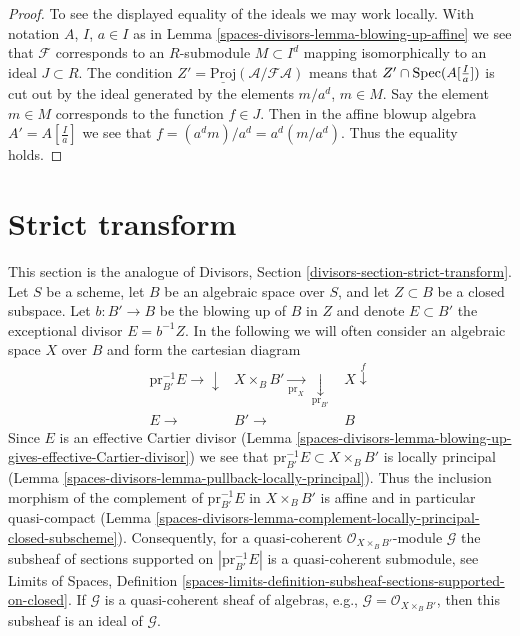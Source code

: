 \begin{proof}
\medskip\noindent
To see the displayed equality of the ideals we may work locally.
With notation $A$, $I$, $a \in I$ as in Lemma \ref{spaces-divisors-lemma-blowing-up-affine}
we see that $\mathcal{F}$ corresponds to an $R$-submodule $M \subset I^d$
mapping isomorphically to an ideal $J \subset R$. The condition
$Z' = \underline{\text{Proj}}(\mathcal{A}/\mathcal{F}\mathcal{A})$
means that $Z' \cap \operatorname{Spec}(A[\frac{I}{a}])$ is cut out by the ideal
generated by the elements $m/a^d$, $m \in M$. Say the element $m \in M$
corresponds to the function $f \in J$. Then in the affine blowup algebra
$A' = A[\frac{I}{a}]$ we see that $f = (a^dm)/a^d = a^d (m/a^d)$.
Thus the equality holds.
\end{proof}

\section{Strict transform}
\label{spaces-divisors-section-strict-transform}
This section is the analogue of
Divisors, Section \ref{divisors-section-strict-transform}.
Let $S$ be a scheme, let $B$ be an algebraic space over $S$, and
let $Z \subset B$ be a closed subspace.
Let $b : B' \to B$ be the blowing up of $B$ in $Z$ and denote $E \subset B'$
the exceptional divisor $E = b^{-1}Z$. In the following we will often
consider an algebraic space $X$ over $B$ and form the cartesian diagram
$$
\begin{array}{ccc}\text{pr}_{B'}^{-1}E \longrightarrow\downarrow & X \times_B B' \underset{\text{pr}_X}{\longrightarrow}\underset{\text{pr}_{B'}}{\downarrow} & X \overset{f}{\downarrow} \\ E \longrightarrow & B' \longrightarrow & B\end{array}
$$
Since $E$ is an effective Cartier divisor
(Lemma \ref{spaces-divisors-lemma-blowing-up-gives-effective-Cartier-divisor})
we see that $\text{pr}_{B'}^{-1}E \subset X \times_B B'$
is locally principal
(Lemma \ref{spaces-divisors-lemma-pullback-locally-principal}).
Thus the inclusion morphism of the complement of
$\text{pr}_{B'}^{-1}E$ in $X \times_B B'$
is affine and in particular quasi-compact
(Lemma \ref{spaces-divisors-lemma-complement-locally-principal-closed-subscheme}).
Consequently, for a quasi-coherent $\mathcal{O}_{X \times_B B'}$-module
$\mathcal{G}$ the subsheaf of sections supported on $|\text{pr}_{B'}^{-1}E|$
is a quasi-coherent submodule, see
Limits of Spaces, Definition
\ref{spaces-limits-definition-subsheaf-sections-supported-on-closed}.
If $\mathcal{G}$ is a quasi-coherent sheaf of algebras, e.g.,
$\mathcal{G} = \mathcal{O}_{X \times_B B'}$, then this subsheaf is an ideal
of $\mathcal{G}$.

